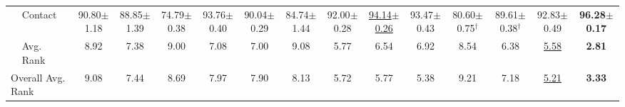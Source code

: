 \begin{table}[t]
{\begin{tabular}{llccccccccccccc}
 & Contact & 90.80{\scriptsize$\pm$1.18} & 88.85{\scriptsize$\pm$1.39} & 74.79{\scriptsize$\pm$0.38} & 93.76{\scriptsize$\pm$0.40} & 90.04{\scriptsize$\pm$0.29} & 84.74{\scriptsize$\pm$1.44} & 92.00{\scriptsize$\pm$0.28} & \underline{94.14{\scriptsize$\pm$0.26}} & 93.47{\scriptsize$\pm$0.43} & 80.60{\scriptsize$\pm$0.75}$^\dagger$ & 89.61{\scriptsize$\pm$0.38}$^\dagger$ & 92.83{\scriptsize$\pm$0.49} & \textbf{96.28{\scriptsize$\pm$0.17}} \\
\cmidrule{2-15}
 & Avg. Rank & 8.92 & 7.38 & 9.00 & 7.08 & 7.00 & 9.08 & 5.77 & 6.54 & 6.92 & 8.54 & 6.38 & \underline{5.58} & \textbf{2.81} \\
\midrule
\multicolumn{2}{l}{Overall Avg. Rank} & 9.08 & 7.44 & 8.69 & 7.97 & 7.90 & 8.13 & 5.72 & 5.77 & 5.38 & 9.21 & 7.18 & \underline{5.21} & \textbf{3.33} \\
\bottomrule
\end{tabular}}
\end{table}
